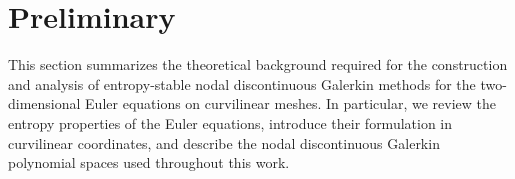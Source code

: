 \documentclass[fleqn,11pt]{amsart}
\begin{document}
\section{Preliminary}
\label{sec:preliminary}
This section summarizes the theoretical background required for the
construction and analysis of entropy-stable nodal discontinuous
Galerkin methods for the two-dimensional Euler equations on
curvilinear meshes. In particular, we review the entropy properties of
the Euler equations, introduce their formulation in curvilinear
coordinates, and describe the nodal discontinuous Galerkin polynomial
spaces used throughout this work.

\end{document}
